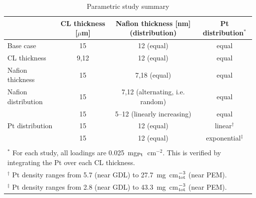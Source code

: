 \documentclass[final,3p,times,twocolumn]{elsarticle}    %
\newcommand{\crr}[1]{\color{red} #1 \color{black}}
\begin{document}
\begin{table}[!htb]
    \small
    \centering
    \caption{Parametric study summary}
    \vspace*{1mm}

    \begin{tabular}{l c c c}
    \hline \hline
    & CL thickness [$\mu$m] & Nafion thickness [nm] (distribution)  & Pt distribution$^{*}$ \\
    \hline 
    Base case           & 15   & 12 \crr{(equal)}                   & \crr{equal} \\
    CL thickness        & 9,12 & 12 \crr{(equal)}                   & \crr{equal} \\
    Nafion thickness    & 15   & 7,18 \crr{(equal)}                 & \crr{equal} \\
    Nafion distribution & 15   & 7,12 (alternating, i.e. random)    & \crr{equal} \\ 
                        & 15   & 5--12 (linearly increasing)        & \crr{equal} \\ 
    Pt distribution     & 15   & 12 \crr{(equal)}                   & linear$^{\dagger}$ \\ 
                        & 15   & 12 \crr{(equal)}                   & exponential$^{\ddagger}$ \\ 
    \hline \hline \vspace*{-3mm} \\
    \multicolumn{4}{l}{$^{*}$ For each study, all loadings are 0.025~mg$_{\rm Pt}$~cm$^{-2}$. This is verified by integrating the Pt over each CL thickness.} \\
    \multicolumn{4}{l}{$^{\dagger}$ Pt density ranges from 5.7 (near GDL) to 27.7~mg~cm$^{-3}_{\rm tot}$ (near PEM).} \\
    \multicolumn{4}{l}{$^{\ddagger}$ Pt density ranges from 2.8 (near GDL) to 43.3~mg~cm$^{-3}_{\rm tot}$ (near PEM).}
    \end{tabular}
    \label{tab:design-study}
\end{table}
\end{document}
